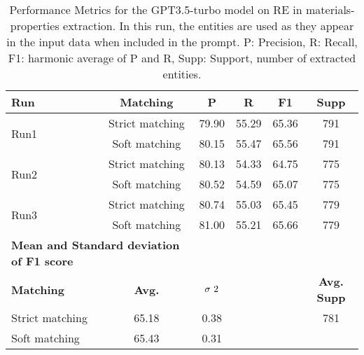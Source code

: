 \begin{table}[htbp]
  \small
  \centering
  \caption{Performance Metrics for the GPT3.5-turbo model on RE in materials-properties extraction. In this run, the entities are used as they appear in the input data when included in the prompt. P: Precision, R: Recall, F1: harmonic average of P and R, Supp: Support, number of extracted entities.}
  \begin{tabular}{lccccc}
    \toprule
    \textbf{Run} & \textbf{Matching} & \textbf{P} & \textbf{R} & \textbf{F1} & \textbf{Supp} \\
    \midrule
    \multirow{2}{*}{Run1} & Strict matching & 79.90 & 55.29 & 65.36 & 791 \\
    & Soft matching & 80.15 & 55.47 & 65.56 & 791 \\
    \midrule
    \multirow{2}{*}{Run2} & Strict matching & 80.13 & 54.33 & 64.75 & 775 \\
    & Soft matching & 80.52 & 54.59 & 65.07 & 775 \\
    \midrule
    \multirow{2}{*}{Run3} & Strict matching & 80.74 & 55.03 & 65.45 & 779 \\
    & Soft matching & 81.00 & 55.21 & 65.66 & 779 \\
    \midrule
    \multicolumn{2}{l}{\textbf{Mean and Standard deviation of F1 score}} & & & & \\
    \midrule
    \textbf{Matching} & \textbf{Avg.} & $\sigma\textsuperscript{2}$ & & & \textbf{Avg. Supp}\\
    Strict matching & 65.18 & 0.38 & & & 781 \\
    Soft matching & 65.43 & 0.31 & & & \\
    \bottomrule
  \end{tabular}
\end{table}


